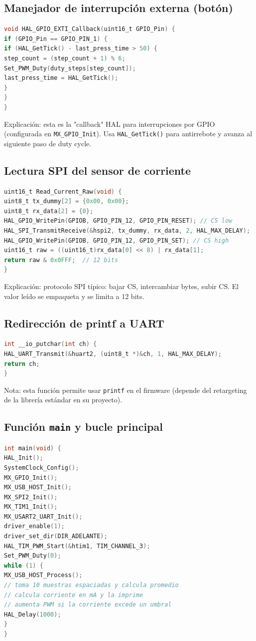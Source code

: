 \documentclass[a4paper,12pt]{article}
\begin{document}
\subsection{Manejador de interrupción externa (botón)}
\begin{lstlisting}[language=C]
void HAL_GPIO_EXTI_Callback(uint16_t GPIO_Pin) {
if (GPIO_Pin == GPIO_PIN_1) {
if (HAL_GetTick() - last_press_time > 50) {
step_count = (step_count + 1) % 6;
Set_PWM_Duty(duty_steps[step_count]);
last_press_time = HAL_GetTick();
}
}
}
\end{lstlisting}

Explicación: esta es la "callback" HAL para interrupciones por GPIO (configurada en \texttt{MX\_GPIO\_Init}). Usa \texttt{HAL\_GetTick()} para antirrebote y avanza al siguiente paso de duty cycle.

\newpage

\subsection{Lectura SPI del sensor de corriente}
\begin{lstlisting}[language=C]
uint16_t Read_Current_Raw(void) {
uint8_t tx_dummy[2] = {0x00, 0x00};
uint8_t rx_data[2] = {0};
HAL_GPIO_WritePin(GPIOB, GPIO_PIN_12, GPIO_PIN_RESET); // CS low
HAL_SPI_TransmitReceive(&hspi2, tx_dummy, rx_data, 2, HAL_MAX_DELAY);
HAL_GPIO_WritePin(GPIOB, GPIO_PIN_12, GPIO_PIN_SET); // CS high
uint16_t raw = ((uint16_t)rx_data[0] << 8) | rx_data[1];
return raw & 0x0FFF;  // 12 bits
}
\end{lstlisting}

Explicación: protocolo SPI típico: bajar CS, intercambiar bytes, subir CS. El valor leído se empaqueta y se limita a 12 bits.

\subsection{Redirección de printf a UART}
\begin{lstlisting}[language=C]
int __io_putchar(int ch) {
HAL_UART_Transmit(&huart2, (uint8_t *)&ch, 1, HAL_MAX_DELAY);
return ch;
}
\end{lstlisting}

Nota: esta función permite usar \texttt{printf} en el firmware (depende del retargeting de la librería estándar en su proyecto).

\subsection{Función \texttt{main} y bucle principal}
\begin{lstlisting}[language=C]
int main(void) {
HAL_Init();
SystemClock_Config();
MX_GPIO_Init();
MX_USB_HOST_Init();
MX_SPI2_Init();
MX_TIM1_Init();
MX_USART2_UART_Init();
driver_enable(1);
driver_set_dir(DIR_ADELANTE);
HAL_TIM_PWM_Start(&htim1, TIM_CHANNEL_3);
Set_PWM_Duty(0);
while (1) {
MX_USB_HOST_Process();
// toma 10 muestras espaciadas y calcula promedio
// calcula corriente en mA y la imprime
// aumenta PWM si la corriente excede un umbral
HAL_Delay(1000);
}
}
\end{lstlisting}
\end{document}
